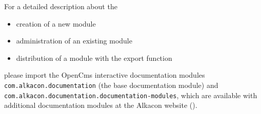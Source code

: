 For a detailed description about the

\begin{itemize}

\item creation of a new module

\item administration of an existing module

\item distribution of a module with the export function 

\end{itemize}

please import the OpenCms interactive documentation modules \texttt{com.alkacon.documentation} (the base documentation module)
and \texttt{com.alkacon.documentation.documentation-modules}, 
which are available with additional documentation modules at the Alkacon website 
().